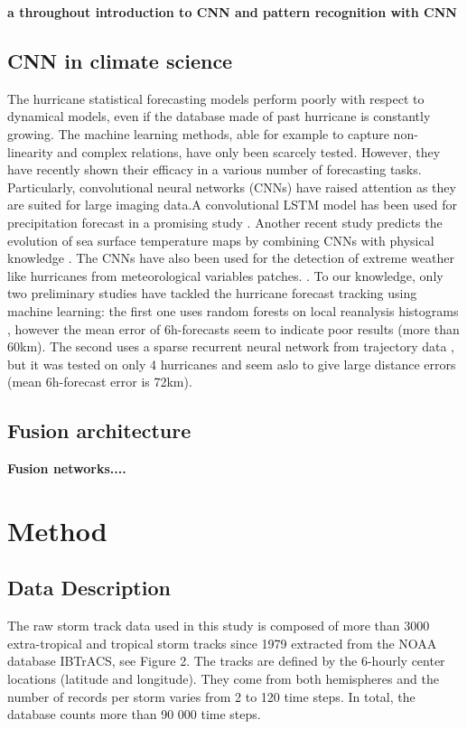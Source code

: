 \textbf{a throughout introduction to CNN and pattern recognition with CNN}


\section{CNN in climate science}
The hurricane statistical forecasting models perform poorly with respect to dynamical models, even if the database made of past hurricane is constantly growing. The machine learning methods, able for example to capture non-linearity and complex relations, have only been scarcely tested. However, they have recently shown their efficacy in a various number of forecasting tasks. Particularly, convolutional neural networks (CNNs) have raised attention as they are suited for large imaging data.A convolutional LSTM model has been used for precipitation forecast in a promising study \cite{xingjian2015convolutional}. Another recent study predicts the evolution of sea surface temperature maps by combining CNNs with physical knowledge \cite{de2017deep}. The CNNs have also been used for the detection of extreme weather like hurricanes from meteorological variables patches. \cite{racah2017extremeweather}.
To our knowledge, only two preliminary studies have tackled the hurricane forecast tracking using machine learning: the first one uses random forests on local reanalysis histograms \cite{liberge2011prevision}, however the mean error of 6h-forecasts seem to indicate poor results (more than 60km). The second uses a sparse recurrent neural network from trajectory data \cite{moradi2016sparse}, but it was tested on only 4 hurricanes and seem aslo to give large distance errors (mean 6h-forecast error is 72km).


\section{Fusion architecture}
\textbf{Fusion networks....}



\chapter{Method}

\section{Data Description}
The raw storm track data used in this study is composed of more than 3000 extra-tropical and tropical storm tracks since 1979 extracted from the NOAA database IBTrACS\cite{knapp2010international}, see Figure 2. The tracks are defined by the 6-hourly center locations (latitude and longitude). They come from both hemispheres and the number of records per storm varies from 2 to 120 time steps. In total, the database counts more than 90 000 time steps. 

